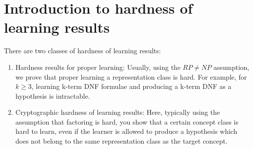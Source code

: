 \documentclass{article}
\begin{document}
%


%
%
%
%

%
\section{Introduction to hardness of learning results}

There are two classes of hardness of learning results:
\begin{enumerate}
 \item Hardness results for proper learning: Usually, using the $RP \neq NP$ assumption, we prove that proper learning a representation class is hard. For example, for $k \geq 3$, learning k-term DNF formulae and producing a k-term DNF as a hypothesis is intractable.
 \item Cryptographic hardness of learning results: Here, typically using the assumption that factoring is hard, you show that a certain concept class is hard to learn, even if the learner is allowed to produce a hypothesis which does not belong to the same representation class as the target concept.
\end{enumerate}
\end{document}
